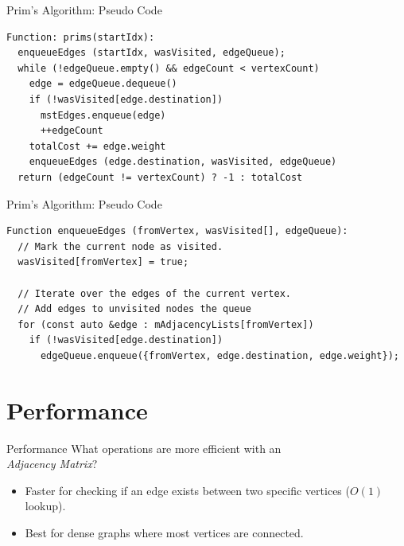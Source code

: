 \documentclass[14pt,aspectratio=1610]{beamer}
\begin{document}
\begin{frame}[fragile]{Prim's Algorithm: Pseudo Code}
\begin{lstlisting}[basicstyle=\ttfamily\footnotesize,]
Function: prims(startIdx):
  enqueueEdges (startIdx, wasVisited, edgeQueue);
  while (!edgeQueue.empty() && edgeCount < vertexCount)
    edge = edgeQueue.dequeue()
    if (!wasVisited[edge.destination])
      mstEdges.enqueue(edge)
      ++edgeCount
    totalCost += edge.weight
    enqueueEdges (edge.destination, wasVisited, edgeQueue)
  return (edgeCount != vertexCount) ? -1 : totalCost
\end{lstlisting}
\end{frame}

\begin{frame}[fragile]{Prim's Algorithm: Pseudo Code}
\begin{lstlisting}[basicstyle=\ttfamily\footnotesize,]
Function enqueueEdges (fromVertex, wasVisited[], edgeQueue):
  // Mark the current node as visited.
  wasVisited[fromVertex] = true;

  // Iterate over the edges of the current vertex.
  // Add edges to unvisited nodes the queue
  for (const auto &edge : mAdjacencyLists[fromVertex])
    if (!wasVisited[edge.destination])
      edgeQueue.enqueue({fromVertex, edge.destination, edge.weight});
\end{lstlisting}
\end{frame}

\section{Performance}

\begin{frame}{Performance}
  \large
  What operations are more efficient with an\\
  \emph{Adjacency Matrix}?

  \pause{}
  \begin{itemize}
    \item
      Faster for checking if an edge exists between two specific vertices (\(O(1)\) lookup).
    \item
      Best for dense graphs where most vertices are connected.
  \end{itemize}
\end{frame}
\end{document}
